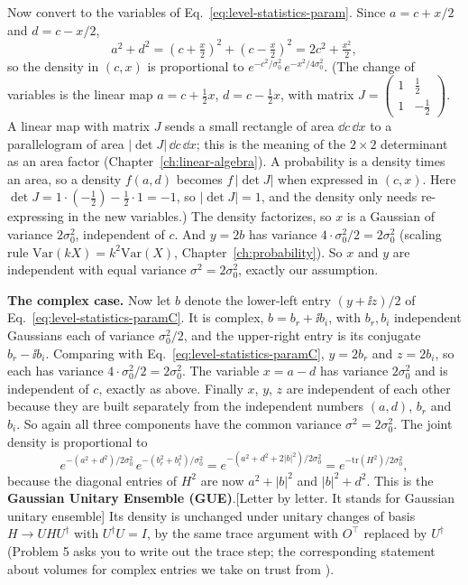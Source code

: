 Now convert to the variables of Eq.~\eqref{eq:level-statistics-param}. Since $a=c+x/2$ and $d=c-x/2$,
\begin{equation}
a^2+d^2=\left(c+\tfrac x2\right)^2+\left(c-\tfrac x2\right)^2=2c^2+\tfrac{x^2}{2},
\end{equation}
so the density in $(c,x)$ is proportional to $e^{-c^2/\sigma_0^2}\,e^{-x^2/4\sigma_0^2}$. (The change of variables is the linear map $a=c+\tfrac12x$, $d=c-\tfrac12x$, with matrix $J=\begin{pmatrix}1&\tfrac12\\1&-\tfrac12\end{pmatrix}$. A linear map with matrix $J$ sends a small rectangle of area $\dd c\,\dd x$ to a parallelogram of area $|\det J|\,\dd c\,\dd x$; this is the meaning of the $2\times2$ determinant as an area factor (Chapter~\ref{ch:linear-algebra}). A probability is a density times an area, so a density $f(a,d)$ becomes $f\,|\det J|$ when expressed in $(c,x)$. Here $\det J=1\cdot(-\tfrac12)-\tfrac12\cdot1=-1$, so $|\det J|=1$, and the density only needs re-expressing in the new variables.) The density factorizes, so $x$ is a Gaussian of variance $2\sigma_0^2$, independent of $c$. And $y=2b$ has variance $4\cdot\sigma_0^2/2=2\sigma_0^2$ (scaling rule $\mathrm{Var}(kX)=k^2\mathrm{Var}(X)$, Chapter~\ref{ch:probability}). So $x$ and $y$ are independent with equal variance $\sigma^2=2\sigma_0^2$, exactly our assumption.

\textbf{The complex case.} Now let $b$ denote the lower-left entry $(y+\ii z)/2$ of Eq.~\eqref{eq:level-statistics-paramC}. It is complex, $b=b_r+\ii b_i$, with $b_r,b_i$ independent Gaussians each of variance $\sigma_0^2/2$, and the upper-right entry is its conjugate $b_r-\ii b_i$. Comparing with Eq.~\eqref{eq:level-statistics-paramC}, $y=2b_r$ and $z=2b_i$, so each has variance $4\cdot\sigma_0^2/2=2\sigma_0^2$. The variable $x=a-d$ has variance $2\sigma_0^2$ and is independent of $c$, exactly as above. Finally $x$, $y$, $z$ are independent of each other because they are built separately from the independent numbers $(a,d)$, $b_r$ and $b_i$. So again all three components have the common variance $\sigma^2=2\sigma_0^2$. The joint density is proportional to
\[
e^{-(a^2+d^2)/2\sigma_0^2}\,e^{-(b_r^2+b_i^2)/\sigma_0^2}=e^{-(a^2+d^2+2|b|^2)/2\sigma_0^2}=e^{-\mathrm{tr}(H^2)/2\sigma_0^2},
\]
because the diagonal entries of $H^2$ are now $a^2+|b|^2$ and $|b|^2+d^2$. This is the \textbf{Gaussian Unitary Ensemble (GUE)}.[Letter by letter. It stands for Gaussian unitary ensemble] Its density is unchanged under unitary changes of basis $H\to UHU^\dagger$ with $U^\dagger U=I$, by the same trace argument with $O^\top$ replaced by $U^\dagger$ (Problem 5 asks you to write out the trace step; the corresponding statement about volumes for complex entries we take on trust from \cite{mehta}).

